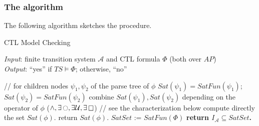 \documentclass{article}
\begin{document}
\subsubsection{The algorithm}
The following algorithm sketches the procedure. 
\label{subsec-CTLmca}
\begin{algorithm}[H]
    \caption{CTL Model Checking}
    \hspace*{\algorithmicindent} \emph{Input}: finite transition system $\mathcal{A}$ and CTL formula $\Phi$ (both over $AP$) \\
    \hspace*{\algorithmicindent} \emph{Output}: ``yes'' if $TS \vDash \Phi$; otherwise, ``no''
    \begin{algorithmic}[1]
            \State // for children nodes $\psi_1, \psi_2$ of the parse tree of $\phi$
            \State $Sat(\psi_1) = SatFun(\psi_1)$; $Sat(\psi_2) = SatFun(\psi_2)$ 
            \State combine $Sat(\psi_1), Sat(\psi_2)$ depending on the operator of $\phi$ ($\land, \exists\mathop{\ocircle}, \exists\mathbin{\mathcal{U}}, \exists\mathop{\square}$)
            \State // see the characterization below
        \Else
            \State compute directly the set $Sat(\phi)$.
        \EndIf
        \State return $Sat(\phi)$.
    \EndFunction
    \State \large $SatSet$ := $SatFun(\Phi)$
    \State \textbf{return $I_{\mathcal{A}} \subseteq SatSet$.}
    \end{algorithmic}
\end{algorithm}
\end{document}

